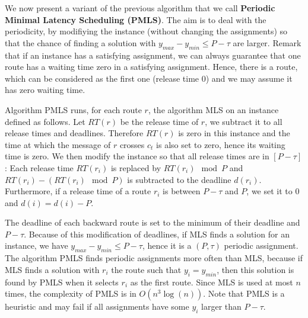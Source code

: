 \documentclass[a4paper,10pt]{article}
\begin{document}
     
     We now present a variant of the previous algorithm that we call {\bf Periodic Minimal Latency Scheduling (PMLS)}. The aim is to deal with the periodicity, by modifiying the instance (without changing the assignments) so that the chance of finding a solution with $y_{max}- y_{min} \leq P -\tau $ are larger.  Remark that if an instance has a satisfying assignment, we can always guarantee that one route has a waiting time zero in a satisfying assignment. Hence, there is a route, which can be considered as the first one (release time $0$) and we may assume it has zero waiting time.
     
     Algorithm PMLS runs, for each route $r$, the algorithm MLS on an instance defined as follows. 
     Let $RT(r)$ be the release time of $r$, we subtract it to all release times and deadlines.
     Therefore $RT(r)$ is zero in this instance and the time at which the message of $r$ crosses $c_t$ is also set to zero, hence its waiting time is zero.  We then modify the instance so that all release times are in $[P-\tau]$: Each release time $RT(r_i)$ is replaced by $RT(r_i) \mod P$ and $RT(r_i) - (RT(r_i) \mod P)$ is subtracted to the deadline $d(r_i)$. Furthermore, if a release time of a route $r_i$ is between $ P-\tau$ and $P$, we set it to $0$ and $d(i) = d(i) - P$. 
     
     The deadline of each backward route is set to the minimum of their deadline and $P - \tau$. Because of this modification of deadlines, if MLS finds a solution for an instance, we have $y_{max}- y_{min} \leq P -\tau $, hence it is a $(P,\tau)$ periodic assignment.  The algorithm PMLS finds periodic assignments more often than MLS, because if MLS finds a solution with $r_i$ the route such that $y_i = y_{min}$, then this solution is found by PMLS when it selects $r_i$ as the first route. Since MLS is used at most $n$ times, the complexity of PMLS is in $O(n^3\log(n))$. Note that PMLS is a heuristic and may fail if all assignments have some $y_i$ larger than $P - \tau$.
     
%   
%     
% 
%     
% 
% 
\end{document}
